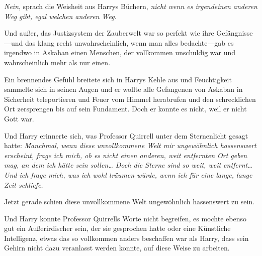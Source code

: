 \emph{Nein}, sprach die Weisheit aus Harrys Büchern, \emph{nicht wenn es irgendeinen anderen Weg gibt, egal welchen anderen Weg.}

Und außer, das Justizsystem der Zauberwelt war so perfekt wie ihre Gefängnisse—und das klang recht unwahrscheinlich, wenn man alles bedachte—gab es irgendwo in Askaban einen Menschen, der vollkommen unschuldig war und wahrscheinlich mehr als nur einen.

Ein brennendes Gefühl breitete sich in Harrys Kehle aus und Feuchtigkeit sammelte sich in seinen Augen und er wollte alle Gefangenen von Askaban in Sicherheit teleportieren und Feuer vom Himmel herabrufen und den schrecklichen Ort zersprengen bis auf sein Fundament. Doch er konnte es nicht, weil er nicht Gott war.

Und Harry erinnerte sich, was Professor Quirrell unter dem Sternenlicht gesagt hatte: \emph{Manchmal, wenn diese unvollkommene Welt mir ungewöhnlich hassenswert erscheint, frage ich mich, ob es nicht einen anderen, weit entfernten Ort geben mag, an dem ich hätte sein sollen… Doch die Sterne sind so weit, weit entfernt… Und ich frage mich, was ich wohl träumen würde, wenn ich für eine lange, lange Zeit schliefe.}

Jetzt gerade schien diese unvollkommene Welt ungewöhnlich hassenswert zu sein.

Und Harry konnte Professor Quirrells Worte nicht begreifen, es mochte ebenso gut ein Außerirdischer sein, der sie gesprochen hatte oder eine Künstliche Intelligenz, etwas das so vollkommen anders beschaffen war als Harry, dass sein Gehirn nicht dazu veranlasst werden konnte, auf diese Weise zu arbeiten.

